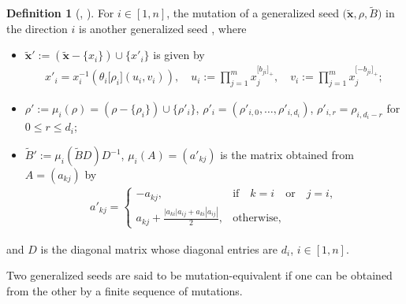 \documentclass[11pt, reqno]{amsart}
\theoremstyle{plain}
\theoremstyle{definition}
\newtheorem{definition}[theorem]{Definition}
\numberwithin{equation}{section}
\begin{document}
\begin{definition}[{\cite[Definition 2.2]{CS14}}, {\cite[Definition 2.6]{Fra20}}]\label{Def: the mutation of a generalized cluster seed}
For $i\in [1,n]$, the mutation of a generalized seed $\big(\widetilde{\mathbf{x}},\rho,\widetilde{B}\big)$ in the direction $i$ is another generalized seed , where
\begin{itemize}
\item[(1)] $\widetilde{\mathbf{x}}':=(\widetilde{\mathbf{x}}- \{x_i\})\cup\{x'_{i}\}$ is given by
\begin{align*}
x'_i =x_i^{-1}(\theta_i\lbrack \rho_i\rbrack(u_i,v_i)), \quad u_i := \displaystyle \prod_{j=1}^m x_j^{\lbrack b_{ji}\rbrack_+}, \quad v_i := \displaystyle \prod_{j=1}^m x_j^{\lbrack -b_{ji}\rbrack_+};
\end{align*} 

\item[(2)] $\rho':=\mu_i(\rho)=(\rho-\{\rho_i\})\cup\{\rho'_i\}$, $\rho'_i=(\rho'_{i,0}, \ldots, \rho'_{i,d_i})$, $\rho'_{i,r} = \rho_{i,d_i-r}$ for $0\leq r \leq d_i$;

\item[(3)] 
$\widetilde{B}':=\mu_i(\widetilde{B}D)D^{-1}$, $\mu_i(A)=(a'_{kj})$ is the matrix obtained from
$A=(a_{kj})$ by
\begin{gather*}
a'_{kj}=
 \begin{cases}
 -a_{kj}, &\text{if}\quad k=i\quad \text{or}\quad j=i,
 \\
a_{kj}+\displaystyle\frac{|a_{ki}|a_{ij}+a_{ki}|a_{ij}|}{2}, &\text{otherwise},
 \end{cases}
\end{gather*}
\end{itemize}
and $D$ is the diagonal matrix whose diagonal entries are $d_i$, $i\in [1, n]$.
\end{definition}


Two generalized seeds are said to be mutation-equivalent if one can be obtained from the other by a finite sequence of mutations.
\end{document}
